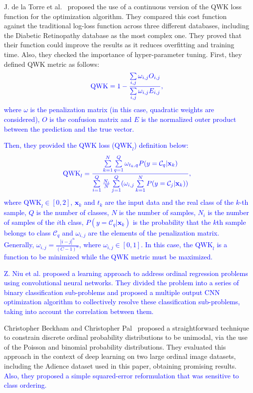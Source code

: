 \documentclass[journal]{IEEEtran}
\begin{document}
	J. de la Torre et al.~\cite{de2018weighted} proposed the use of a continuous version of the QWK loss function for the optimization algorithm. They compared this cost function against the traditional log-loss function across three different databases, including the Diabetic Retinopathy database as the most complex one. They proved that their function could improve the results as it reduces overfitting and training time. Also, they checked the importance of hyper-parameter tuning. First, they defined QWK metric as follows:
	\begin{equation}
	\textcolor{blue}{\text{QWK} = 1 - \frac{\sum\limits_{i,j} \omega_{i,j} O_{i,j}}{\sum\limits_{i,j} \omega_{i,j} E_{i,j}},}
	\end{equation}
	\textcolor{blue}{where $\omega$ is the penalization matrix (in this case, quadratic weights are considered), $O$ is the confusion matrix and $E$ is the normalized outer product between the prediction and the true vector.}
	
	\textcolor{blue}{Then, they provided the QWK loss ($\text{QWK}_l$) definition below:}
	\begin{equation}
	\textcolor{blue}{\text{QWK}_l = \frac{\sum\limits_{k=1}^N \sum\limits_{q=1}^Q \omega_{t_k, q} P(y = \mathcal{C}_q | \mathbf{x}_k)}{\sum\limits_{i=1}^Q \frac{N_i}{N} \sum\limits_{j=1}^Q ( \omega_{i,j} \sum\limits_{k=1}^N P(y = \mathcal{C}_j | \mathbf{x}_k))},}
	\end{equation}
	\textcolor{blue}{where $\text{QWK}_l \in [0,2]$, $\mathbf{x}_k$ and $t_k$ are the input data and the real class of the $k$-th sample, $Q$ is the number of classes, $N$ is the number of samples, $N_i$ is the number of samples of the $i$th class, $P(y = \mathcal{C}_q | \mathbf{x}_k)$ is the probability that the $k$th sample belongs to class $\mathcal{C}_q$ and $\omega_{i,j}$ are the elements of the penalization matrix. Generally, $\omega_{i,j} = \frac{|i-j|^n}{(C-1)^n}$, where $\omega_{i,j} \in [0,1]$. In this case, the $\text{QWK}_l$ is a function to be minimized while the QWK metric must be maximized.}
	
	\textcolor{blue}{Z. Niu et al. \cite{niu2016ordinal} proposed a learning approach to address ordinal regression problems using convolutional neural networks. They divided the problem into a series of binary classification sub-problems and proposed a multiple output CNN optimization algorithm to collectively resolve these classification sub-problems, taking into account the correlation between them.}
	
	Christopher Beckham and Christopher Pal~\cite{beckham2017unimodal} proposed a straightforward technique to constrain discrete ordinal probability distributions to be unimodal, via the use of the Poisson and binomial probability distributions. They evaluated this approach in the context of deep learning on two large ordinal image datasets, including the Adience dataset used in this paper, obtaining promising results.	\textcolor{blue}{Also, they proposed a simple squared-error reformulation \cite{beckham2016simple} that was sensitive to class ordering.}
	
\end{document}
